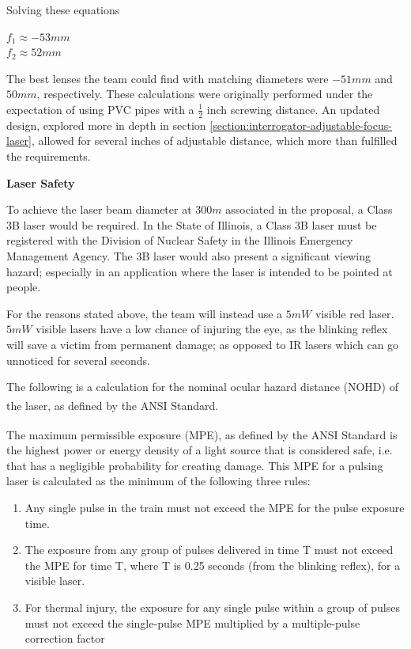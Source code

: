\documentclass[letterpaper,10pt]{article}
\begin{document}
\begin{spacing}{1.15}
Solving these equations
\begin{center}
	\large
	$f_1 \approx -53mm$ \\
	$f_2 \approx  52mm$
\end{center}

The best lenses the team could find with matching diameters were $-51mm$ and $50mm$, respectively. These calculations were originally performed under the expectation of using PVC pipes with a $\frac{1}{2}$ inch screwing distance. An updated design, explored more in depth in section \ref{section:interrogator-adjustable-focus-laser}, allowed for several inches of adjustable distance, which more than fulfilled the requirements. 

\hspace{5mm}\textbf{Laser Safety}

 To achieve the laser beam diameter at $300 m$ associated in the proposal, a Class 3B laser would be required. In the State of Illinois, a Class 3B laser must be registered with the Division of Nuclear Safety in the Illinois Emergency Management Agency. The 3B laser would also present a significant viewing hazard; especially in an application where the laser is intended to be pointed at people. 
 
 For the reasons stated above, the team will instead use a $5mW$ visible red laser. $5mW$ visible lasers have a low chance of injuring the eye, as the blinking reflex will save a victim from permanent damage; as opposed to IR lasers which can go unnoticed for several seconds. 
 
 The following is a calculation for the nominal ocular hazard distance (NOHD) of the laser, as defined by the ANSI Standard\textsuperscript{\cite{ANSI}}.
 
 The maximum permissible exposure (MPE), as defined by the ANSI Standard \textsuperscript{\cite{ANSI}} is the highest power or energy density of a light source that is considered safe, i.e. that has a negligible probability for creating damage. This MPE for a pulsing laser is calculated as the minimum of the following three rules:
 
 \begin{enumerate}
 	\item Any single pulse in the train must not exceed the MPE for the pulse exposure time.
 	\item The exposure from any group of pulses delivered in time T must not exceed the MPE for
 	time T, where T is 0.25 seconds (from the blinking reflex), for a visible laser. 
 	\item For thermal injury, the exposure for any single pulse within a group of pulses must not
 	exceed the single-pulse MPE multiplied by a multiple-pulse correction factor
 \end{enumerate}
 

\end{spacing}
\end{document}
